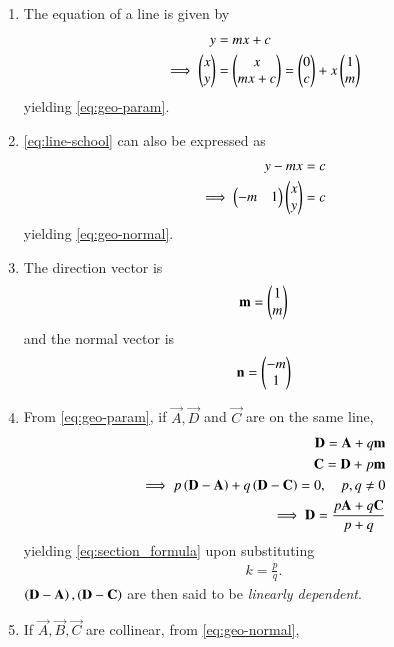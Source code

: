\begin{enumerate}[label=\thesection.\arabic*.,ref=\thesection.\theenumi]
\item The equation of a line is given by 
\begin{align}
			\label{eq:line-school}
	y &= mx + c
	\\
	\implies \begin{pmatrix}x \\ y\end{pmatrix} &= \begin{pmatrix}x \\ 
	 mx + c\end{pmatrix} =\begin{pmatrix}0 \\ c\end{pmatrix} + x\begin{pmatrix}1 \\ m\end{pmatrix}
\end{align}
			yielding \eqref{eq:geo-param}.
\item 			\eqref{eq:line-school} can also be expressed as
\begin{align}
	y - mx &= c 
	\\
	\implies \begin{pmatrix}-m & 1\end{pmatrix}\begin{pmatrix}x \\ y\end{pmatrix} &= c
\end{align}
			yielding \eqref{eq:geo-normal}.
		\item The direction vector is 
\begin{align}
			\label{eq:line-school-dir}
\mathbf{m} = \begin{pmatrix}1 \\ m\end{pmatrix}
\end{align}
and the normal vector is
\begin{align}
\mathbf{n}=\begin{pmatrix}-m \\ 1\end{pmatrix}
			\label{eq:line-school-normal}
\end{align}
  \item From \eqref{eq:geo-param}, 
	  if $\vec{A},\vec{D}$ and $\vec{C}$ are on the same line,
		\label{prop:lin-dep}
\begin{align}
			\mathbf{D}=\mathbf{A}+q\mathbf{m} 
			\\ 
			\mathbf{C}=\mathbf{D}+p\mathbf{m} \\
			\label{eq:collinear} 
			\implies 	p\left(\mathbf{D}-\mathbf{A}\right) 
			+ q\left(\mathbf{D}-\mathbf{C}\right) = 0, \quad p, q \ne 0 \\ 
			\implies \mathbf{D} = \frac{p\mathbf{A}+q\mathbf{C}}{p+q} 
			\end{align} 
			yielding \eqref{eq:section_formula} upon substituting \begin{align} k = \frac{p}{q}. \end{align} 
			$\left(\mathbf{D}-\mathbf{A}\right), \left(\mathbf{D}-\mathbf{C}\right)$ 
		are then said to be {\em linearly dependent}.
	\item If $\vec{A}, \vec{B}, \vec{C}$ are collinear,  from \eqref{eq:geo-normal}, \begin{align}

\end{align}
\end{enumerate}
